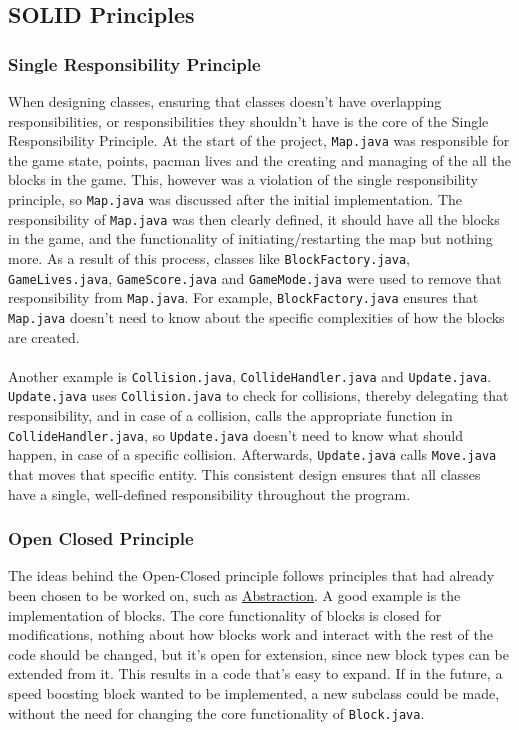\documentclass[a4paper,5pt]{article}
\begin{document}
\subsection{SOLID Principles}
\subsubsection{Single Responsibility Principle}
When designing classes, ensuring that classes doesn't have overlapping responsibilities, or responsibilities they shouldn't have is the core of the Single Responsibility Principle. 
At the start of the project, \texttt{Map.java} was responsible for the game state, points, pacman lives and the creating and managing of the all the blocks in the game. This, however was a violation of the single responsibility principle, so \texttt{Map.java} was discussed after the initial implementation. The responsibility of \texttt{Map.java} was then clearly defined, it should have all the blocks in the game, and the functionality of initiating/restarting the map but nothing more. As a result of this process, classes like \texttt{BlockFactory.java}, \texttt{GameLives.java}, \texttt{GameScore.java} and \texttt{GameMode.java} were used to remove that responsibility from \texttt{Map.java}. For example, \texttt{BlockFactory.java} ensures that \texttt{Map.java} doesn't need to know about the specific complexities of how the blocks are created.\\\\
Another example is \texttt{Collision.java}, \texttt{CollideHandler.java} and \texttt{Update.java}. \texttt{Update.java} uses \texttt{Collision.java} to check for collisions, thereby delegating that responsibility, and in case of a collision, calls the appropriate function in \texttt{CollideHandler.java}, so \texttt{Update.java} doesn't need to know what should happen, in case of a specific collision. Afterwards, \texttt{Update.java} calls \texttt{Move.java} that moves that specific entity. This consistent design ensures that all classes have a single, well-defined responsibility throughout the program.


\subsubsection{Open Closed Principle}
The ideas behind the Open-Closed principle follows principles that had already been chosen to be worked on, such as \hyperref[sec:abstraction]{Abstraction}. A good example is the implementation of blocks. The core functionality of blocks is closed for modifications, nothing about how blocks work and interact with the rest of the code should be changed, but it's open for extension, since new block types can be extended from it. This results in a code that's easy to expand. If in the future, a speed boosting block wanted to be implemented, a new subclass could be made, without the need for changing the core functionality of \texttt{Block.java}.
\end{document}
